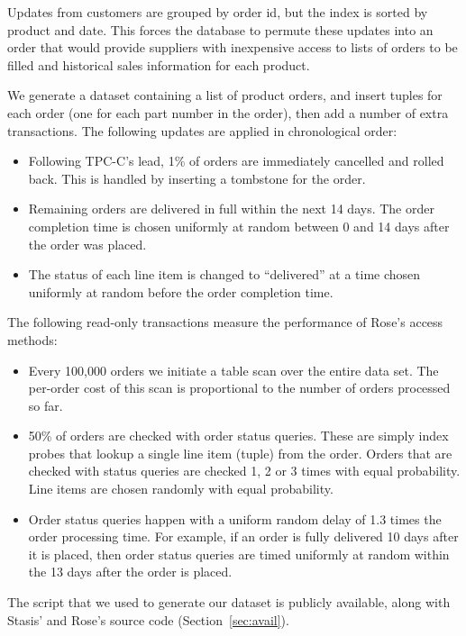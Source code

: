 \documentclass{vldb}
\newcommand{\rowss}{Rose's\xspace}
\begin{document}
Updates from customers are grouped by
order id, but the index is sorted by product and date.
This forces the database to permute these updates
into an order that would provide suppliers with
inexpensive access to lists of orders to
be filled and historical sales information for each product.

We generate a dataset containing a list of product orders, and insert
tuples for each order (one for each part number in the order), then
add a number of extra transactions.  The following updates are applied in chronological order:

\begin{itemize}
\item Following TPC-C's lead, 1\% of orders are immediately cancelled
  and rolled back.  This is handled by inserting a tombstone for the
  order.
\item Remaining orders are delivered in full within the next 14 days.
  The order completion time is chosen uniformly at random between 0
  and 14 days after the order was placed.
\item  The status of each line item is changed to ``delivered'' at a time
  chosen uniformly at random before the order completion time.
\end{itemize}
The following read-only transactions measure the performance of \rowss
access methods:
\begin{itemize}
\item Every 100,000 orders we initiate a table scan over the entire
  data set.  The per-order cost of this scan is proportional to the
  number of orders processed so far.
\item 50\% of orders are checked with order status queries.  These are
  simply index probes that lookup a single line item (tuple) from the
  order.  Orders that are checked with status queries are checked 1, 2
  or 3 times with equal probability.  Line items are chosen randomly
  with equal probability.
\item Order status queries happen with a uniform random delay of 1.3
  times the order processing time.  For example, if an order
  is fully delivered 10 days after it is placed, then order status queries are
  timed uniformly at random within the 13 days after the order is
  placed.
\end{itemize}
The script that we used to generate our dataset is publicly available,
along with Stasis' and \rowss source code (Section~\ref{sec:avail}).
\end{document}
